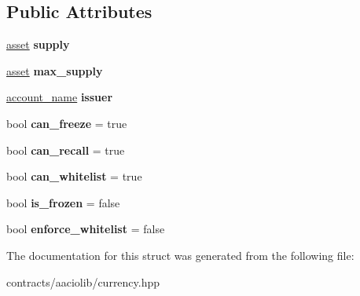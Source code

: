 \subsection*{Public Attributes}
\begin{DoxyCompactItemize}
\item 
\mbox{\label{structaacio_1_1currency_1_1currency__stats_a685761f40e6318cd4d9970a32d50fad6}} 
\mbox{\hyperlink{structaacio_1_1asset}{asset}} {\bfseries supply}
\item 
\mbox{\label{structaacio_1_1currency_1_1currency__stats_a6cf02dc9de82984b0874d4d811a36594}} 
\mbox{\hyperlink{structaacio_1_1asset}{asset}} {\bfseries max\+\_\+supply}
\item 
\mbox{\label{structaacio_1_1currency_1_1currency__stats_a95432505ccdc91819feb12b30b3974cf}} 
\mbox{\hyperlink{structaacio_1_1chain_1_1name}{account\+\_\+name}} {\bfseries issuer}
\item 
\mbox{\label{structaacio_1_1currency_1_1currency__stats_aad00f513a66143b6c368f09d77eb3691}} 
bool {\bfseries can\+\_\+freeze} = true
\item 
\mbox{\label{structaacio_1_1currency_1_1currency__stats_a55877c2b0f0d5c2233af978d83ef9ddb}} 
bool {\bfseries can\+\_\+recall} = true
\item 
\mbox{\label{structaacio_1_1currency_1_1currency__stats_a1ebff776d7edd77c9fd46dfa6de6c21b}} 
bool {\bfseries can\+\_\+whitelist} = true
\item 
\mbox{\label{structaacio_1_1currency_1_1currency__stats_a5d5dbe0e8fdd7f2376b4b14213289629}} 
bool {\bfseries is\+\_\+frozen} = false
\item 
\mbox{\label{structaacio_1_1currency_1_1currency__stats_aaa12e4a0a2b0aa97abb33cd018217586}} 
bool {\bfseries enforce\+\_\+whitelist} = false
\end{DoxyCompactItemize}


The documentation for this struct was generated from the following file\+:\begin{DoxyCompactItemize}
\item 
contracts/aaciolib/currency.\+hpp\end{DoxyCompactItemize}
